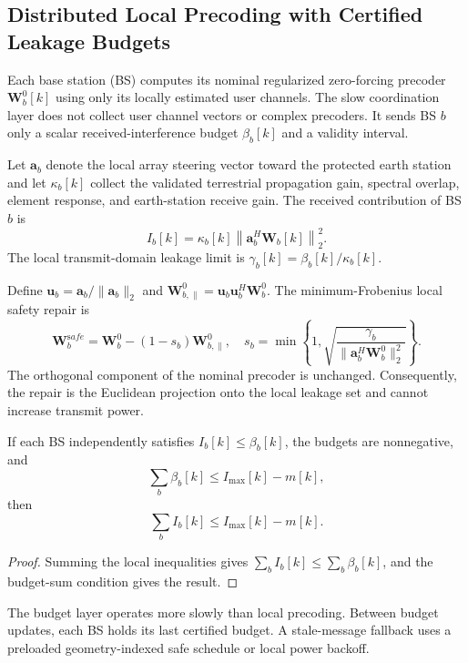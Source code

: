 \subsection{Distributed Local Precoding with Certified Leakage Budgets}
Each base station (BS) computes its nominal regularized zero-forcing precoder
$\mathbf W_b^0[k]$ using only its locally estimated user channels.  The slow
coordination layer does not collect user channel vectors or complex
precoders.  It sends BS $b$ only a scalar received-interference budget
$\beta_b[k]$ and a validity interval.

Let $\mathbf a_b$ denote the local array steering vector toward the protected
earth station and let $\kappa_b[k]$ collect the validated terrestrial
propagation gain, spectral overlap, element response, and earth-station receive
gain.  The received contribution of BS $b$ is
\begin{equation}
 I_b[k]=\kappa_b[k]\left\|\mathbf a_b^H\mathbf W_b[k]\right\|_2^2.
\end{equation}
The local transmit-domain leakage limit is
$\gamma_b[k]=\beta_b[k]/\kappa_b[k]$.

Define $\mathbf u_b=\mathbf a_b/\|\mathbf a_b\|_2$ and
$\mathbf W_{b,\parallel}^0=\mathbf u_b\mathbf u_b^H\mathbf W_b^0$.  The
minimum-Frobenius local safety repair is
\begin{equation}
 \mathbf W_b^{\mathrm safe}
 =
 \mathbf W_b^0-(1-s_b)\mathbf W_{b,\parallel}^0,
 \quad
 s_b=\min\!\left\{
 1,\sqrt{\frac{\gamma_b}
 {\|\mathbf a_b^H\mathbf W_b^0\|_2^2}}
 \right\}.
\end{equation}
The orthogonal component of the nominal precoder is unchanged.  Consequently,
the repair is the Euclidean projection onto the local leakage set and cannot
increase transmit power.

\begin{proposition}
If each BS independently satisfies $I_b[k]\leq\beta_b[k]$, the budgets are
nonnegative, and
\begin{equation}
 \sum_b\beta_b[k]\leq I_{\max}[k]-m[k],
\end{equation}
then
\begin{equation}
 \sum_b I_b[k]\leq I_{\max}[k]-m[k].
\end{equation}
\end{proposition}
\begin{proof}
Summing the local inequalities gives
$\sum_b I_b[k]\leq\sum_b\beta_b[k]$, and the budget-sum condition gives the
result.
\end{proof}

The budget layer operates more slowly than local precoding.  Between budget
updates, each BS holds its last certified budget.  A stale-message fallback
uses a preloaded geometry-indexed safe schedule or local power backoff.
